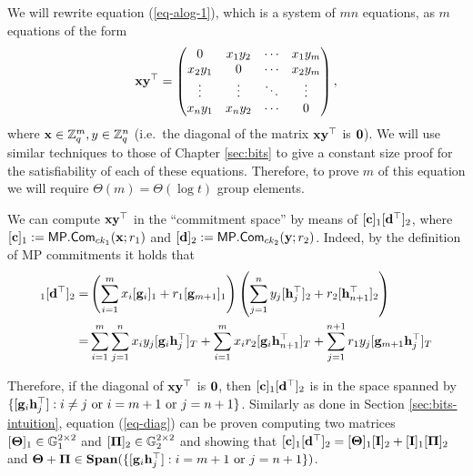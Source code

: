 We will rewrite equation (\ref{eq-alog-1}), which is a system of $m n$ equations, as $m$ equations of the form
\begin{equation}
\mathbf{x}\mathbf{y}^\top=\left(\begin{matrix}0 & x_1y_2 & \cdots & x_1y_m\\x_2y_1& 0 & \cdots & x_2y_m\\\vdots&\vdots&\ddots& \vdots\\x_ny_1&x_ny_2&\cdots&0\end{matrix}\right),
\label{eq-diag}
\end{equation}
where $\mathbf{x}\in\mathbb{Z}_q^m,y\in\mathbb{Z}_q^n$ (i.e.~the diagonal of the matrix $\mathbf{x}\mathbf{y}^\top$ is $\mathbf{0}$). We will use similar techniques to those of Chapter \ref{sec:bits} to give a constant size proof for the satisfiability of each of these equations. Therefore, to prove $m$ of this equation we will require $\Theta(m)=\Theta(\log t)$ group elements.

We can compute $\mathbf{x}\mathbf{y}^\top$ in the ``commitment space'' by means of $[\mathbf{c}]_1[\mathbf{d}^\top]_2$, where $[\mathbf{c}]_1:=\mathsf{MP}.\mathsf{Com}_{ck_1}(\mathbf{x};r_1)$ and $[\mathbf{d}]_2:=\mathsf{MP}.\mathsf{Com}_{ck_2}(\mathbf{y};r_2)$. Indeed, by the definition of MP commitments it holds that
\begin{align*}
[\vecb{c}]_1[\vecb{d}^\top]_2
=&\left(\sum_{i=1}^{m}x_i[\vecb{g}_i]_1+r_1[\vecb{g}_{m+1}]_1\right)\left(\sum_{j=1}^{n}y_j[\vecb{h}_j^\top]_2+r_2[\vecb{h}_{n+1}^\top]_2\right)\\
=&\sum_{i=1}^m\sum_{j=1}^n x_iy_j[\vecb{g}_i\vecb{h}_j^\top]_T+\sum_{i=1}^{m}x_ir_2[\vecb{g}_i\vecb{h}_{n+1}^\top]_T+\sum_{j=1}^{n+1}r_1y_j[\vecb{g}_{m+1}\vecb{h}_j^\top]_T
\end{align*}

Therefore, if the diagonal of $\mathbf{x}\mathbf{y}^\top$ is $\mathbf{0}$, then $[\mathbf{c}]_1[\mathbf{d}^\top]_2$ is in the space spanned by $\{[\mathbf{g}_i\mathbf{h}_j^\top]:i\neq j \text{ or }i=m+1\text{ or } j=n+1\}$. Similarly as done in Section \ref{sec:bits-intuition}, equation (\ref{eq-diag}) can be proven computing two matrices $[\mathbf{{\Theta}}]_1\in\mathbb{G}_1^{2\times2}$ and $[\mathbf{{\Pi}}]_2\in\mathbb{G}_2^{2\times 2}$ and showing that $[\mathbf{c}]_1[\mathbf{d}^\top]_2=[\mathbf{{\Theta}}]_1[\mathbf{{I}}]_2+[\mathbf{{I}}]_1[\mathbf{{\Pi}}]_2$ and $\mathbf{{\Theta}}+\mathbf{{\Pi}}\in\mathbf{Span}(\{[\mathbf{g}_i\mathbf{h}_j^\top]:i=m+1\text{ or }j=n+1\})$.

